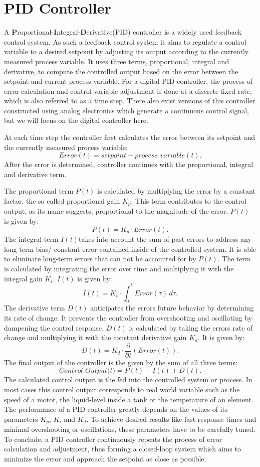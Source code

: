 \section{PID Controller}
A \textbf{P}roportional-\textbf{I}ntegral-\textbf{D}erivative(PID) controller is a widely used feedback control system.
As such a feedback control system it aims to regulate a control variable to a desired setpoint by adjusting its output according to the currently measured process variable.
It uses three terms, proportional, integral and derivative, to compute the controlled output  based on the error between the setpoint and current process variable.
For a digital PID controller, the process of error calculation and control variable adjustment is done at a discrete fixed rate, which is also referred to as a time step.
There also exist versions of this controller constructed using analog electronics which generate a continuous control signal, but we will focus on the digital controller here.

At each time step the controller first calculates the error between its setpoint and the currently measured process variable: 
\[
	Error(t) = setpoint - \textit{process variable}(t)
.\]
After the error is determined, controller continues with the proportional, integral and derivative term.

The proportional term $P(t)$ is calculated by multiplying the error by a constant factor, the so called proportional gain $K_p$.
This term contributes to the control output, as its name suggests, proportional to the magnitude of the error.
$P(t)$ is given by:
\[
	P(t) = K_p \cdot Error(t)
.\]
The integral term $I(t)$takes into account the sum of past errors to address any long term bias/ constant error contained inside of the controlled system.
It is able to eliminate long-term errors that can not be accounted for by $P(t)$.
The term is calculated by integrating the error over time and multiplying it with the integral gain $K_i$.
$I(t)$ is given by:
\[
	I(t) = K_i \cdot \int_{0}^{t} Error(\tau) \,d\tau
.\]
The derivative term $D(t)$ anticipates the errors future behavior by determining its rate of change.
It prevents the controller from overshooting and oscillating by dampening the control response.
$D(t)$ is calculated by taking the errors rate of change and multiplying it with the constant derivative gain $K_d$.
It is given by:
\[
	D(t) = K_d \cdot \frac{\partial}{\partial t}(Error(t))
.\]
The final output of the controller is the given by the sum of all three terms:
\[
	\textit{Control Output(t)} = P(t) + I(t) + D(t)
.\]
The calculated control output is the fed into the controlled system or process.
In most cases this control output corresponds to real world variable such as the speed of a motor, the liquid-level inside a tank or the temperature of an element.
The performance of a PID controller greatly depends on the values of its parameters $K_p$, $K_i$ and $K_d$.
To achieve desired results like fast response times and minimal overshooting or oscillations, these parameters have to be carefully tuned. 
To conclude, a PID controller continuously repeats the process of error calculation and adjustment, thus forming a closed-loop system which aims to minimize the error and approach the setpoint as close as possible.


